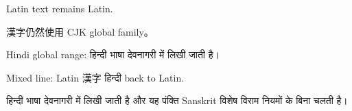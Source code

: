 \documentclass[12pt]{article}
\begin{document}
Latin text remains Latin.

漢字仍然使用 CJK global family。

Hindi global range: हिन्दी भाषा देवनागरी में लिखी जाती है।

Mixed line: Latin 漢字 हिन्दी back to Latin.

\noindent\parbox{2.8cm}{हिन्दी भाषा देवनागरी में लिखी जाती है और यह पंक्ति Sanskrit विशेष विराम नियमों के बिना चलती है।}
\end{document}
